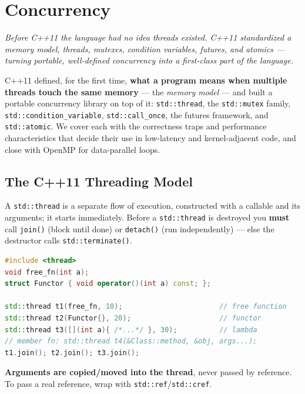 \chapter{Concurrency}
\label{ch:concurrency}

\textit{Before C++11 the language had no idea threads existed. C++11 standardized a memory model, threads, mutexes, condition variables, futures, and atomics --- turning portable, well-defined concurrency into a first-class part of the language.}

C++11 defined, for the first time, \textbf{what a program means when multiple threads touch the same memory} --- the \emph{memory model} --- and built a portable concurrency library on top of it: \texttt{std::thread}, the \texttt{std::mutex} family, \texttt{std::condition\_variable}, \texttt{std::call\_once}, the futures framework, and \texttt{std::atomic}. We cover each with the correctness traps and performance characteristics that decide their use in low-latency and kernel-adjacent code, and close with OpenMP for data-parallel loops.

\section{The C++11 Threading Model}

A \texttt{std::thread} is a separate flow of execution, constructed with a callable and its arguments; it starts immediately. Before a \texttt{std::thread} is destroyed you \textbf{must} call \texttt{join()} (block until done) or \texttt{detach()} (run independently) --- else the destructor calls \texttt{std::terminate()}.

\begin{lstlisting}[language=C++, caption={launching a thread with any callable}]
#include <thread>
void free_fn(int a);
struct Functor { void operator()(int a) const; };

std::thread t1(free_fn, 10);                       // free function
std::thread t2(Functor{}, 20);                     // functor
std::thread t3([](int a){ /*...*/ }, 30);          // lambda
// member fn: std::thread t4(&Class::method, &obj, args...);
t1.join(); t2.join(); t3.join();
\end{lstlisting}

\textbf{Arguments are copied/moved into the thread}, never passed by reference. To pass a real reference, wrap with \texttt{std::ref}/\texttt{std::cref}.

